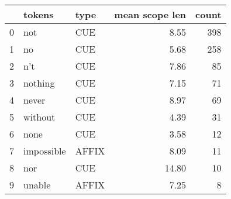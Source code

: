 \begin{tabular}{lllrr}
\toprule
{} &      tokens &   type &  mean scope len &  count \\
\midrule
0 &         not &    CUE &            8.55 &    398 \\
1 &          no &    CUE &            5.68 &    258 \\
2 &         n't &    CUE &            7.86 &     85 \\
3 &     nothing &    CUE &            7.15 &     71 \\
4 &       never &    CUE &            8.97 &     69 \\
5 &     without &    CUE &            4.39 &     31 \\
6 &        none &    CUE &            3.58 &     12 \\
7 &  impossible &  AFFIX &            8.09 &     11 \\
8 &         nor &    CUE &           14.80 &     10 \\
9 &      unable &  AFFIX &            7.25 &      8 \\
\bottomrule
\end{tabular}
